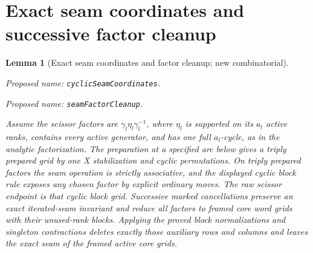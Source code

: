\documentclass[11pt,a4paper]{article}
\newtheorem{lemma}[theorem]{Lemma}
\theoremstyle{remark}
\newcommand{\formalname}[1]{\leavevmode\par\noindent\textnormal{\small Proposed name: \texttt{#1}.}\par\smallskip}
\begin{document}
\section{Exact seam coordinates and successive factor cleanup}

\begin{lemma}[Exact seam coordinates and factor cleanup; new combinatorial]
\label{lem:seam-cleanup}
\formalname{cyclicSeamCoordinates}\formalname{seamFactorCleanup}
Assume the scissor factors are $\gamma_l\eta_l\gamma_l^{-1}$, where
$\eta_l$ is supported on its $a_l$ active ranks, contains every
active generator, and has one full $a_l$-cycle, as in the analytic
factorization.  The preparation at a specified arc below gives a triply prepared
grid by one X stabilization and cyclic permutations.  On triply
prepared factors the seam operation is strictly associative, and
the displayed cyclic block rule exposes any chosen factor by
explicit ordinary moves.  The raw scissor endpoint is that cyclic
block grid.  Successive marked cancellations preserve an exact
iterated-seam invariant and reduce all factors to framed core word
grids with their unused-rank blocks.  Applying the proved block
normalizations and singleton contractions deletes exactly those
auxiliary rows and columns and leaves the exact seam of the
framed active core grids.
\end{lemma}
\end{document}
